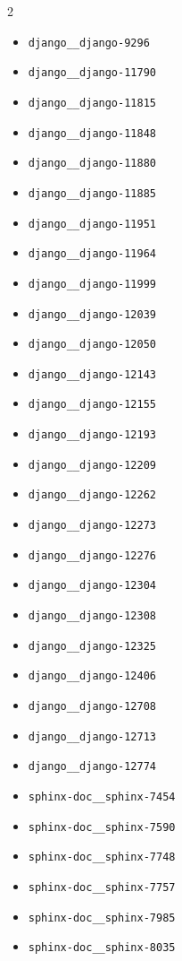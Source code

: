 \documentclass{article} %
\begin{document}
\begin{multicols}{2}
\begin{itemize}
  \item \texttt{django\_\_django-9296}
  \item \texttt{django\_\_django-11790}
  \item \texttt{django\_\_django-11815}
  \item \texttt{django\_\_django-11848}
  \item \texttt{django\_\_django-11880}
  \item \texttt{django\_\_django-11885}
  \item \texttt{django\_\_django-11951}
  \item \texttt{django\_\_django-11964}
  \item \texttt{django\_\_django-11999}
  \item \texttt{django\_\_django-12039}
  \item \texttt{django\_\_django-12050}
  \item \texttt{django\_\_django-12143}
  \item \texttt{django\_\_django-12155}
  \item \texttt{django\_\_django-12193}
  \item \texttt{django\_\_django-12209}
  \item \texttt{django\_\_django-12262}
  \item \texttt{django\_\_django-12273}
  \item \texttt{django\_\_django-12276}
  \item \texttt{django\_\_django-12304}
  \item \texttt{django\_\_django-12308}
  \item \texttt{django\_\_django-12325}
  \item \texttt{django\_\_django-12406}
  \item \texttt{django\_\_django-12708}
  \item \texttt{django\_\_django-12713}
  \item \texttt{django\_\_django-12774}
  \item \texttt{sphinx-doc\_\_sphinx-7454}
  \item \texttt{sphinx-doc\_\_sphinx-7590}
  \item \texttt{sphinx-doc\_\_sphinx-7748}
  \item \texttt{sphinx-doc\_\_sphinx-7757}
  \item \texttt{sphinx-doc\_\_sphinx-7985}
  \item \texttt{sphinx-doc\_\_sphinx-8035}

\end{itemize}
\end{multicols}
\end{document}

